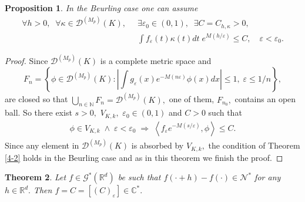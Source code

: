 \documentclass[sn-mathphys,Numbered]{sn-jnl}%
\theoremstyle{thmstyleone}%
\newtheorem{theorem}{Theorem}%
\newtheorem{proposition}[theorem]{Proposition}%
\theoremstyle{thmstyletwo}%
\newtheorem{remark}{Remark}%
\theoremstyle{thmstylethree}%
\begin{document}


\begin{proposition}\label{p6}
In the Beurling case one can assume 
\begin{align*}
\forall h>0,\;\;\forall \kappa\in\mathcal{D}^{(M_p)}(K),\;\;&\exists \varepsilon_0\in (0,1),\;\;\exists C=C_{h,\kappa}>0,\\
&\int f_\varepsilon(t)\kappa(t)dt\;e^{M(h/\varepsilon)}\leq C,\quad \varepsilon<\varepsilon_0.
\end{align*}
\end{proposition}

\begin{proof}
Since $\mathcal{D}^{(M_p)}(K)$ is a complete metric space and 
\begin{equation*}
F_n=\left\{\phi\in \mathcal{D}^{(M_p)}(K): \left|\int g_\varepsilon (x)e^{-M(n\varepsilon)}\phi(x)dx\right|\leq 1, \; \varepsilon\leq 1/n \right\},
\end{equation*}
are closed so that $\bigcup_{n\in\mathbb{N}}F_n=\mathcal{D}^{(M_p)}(K),$ one of them, $F_{n_0},$ contains an open ball. So there exist $s>0,$ $V_{K,k},$ $\varepsilon_0\in (0,1)$ and $C>0$ such that
\begin{align*}
\phi\in V_{K,k}\;\wedge\;\varepsilon<\varepsilon_0\;\Rightarrow\;\left\langle f_\varepsilon e^{-M(s/\varepsilon)},\phi\right\rangle\leq C.
\end{align*}
Since any element in $\mathcal D^{(M_p)}(K)$ is absorbed by $V_{K,k},$ the condition of Theorem \ref{4-2} holds in the Beurling case and as in this theorem we finish the proof.
\end{proof}





\begin{theorem}
Let $f\in \mathcal{G}^{*}(\mathbb{R}^d)$ be such that $f(\cdot+h)-f(\cdot)\in\mathcal N^{*}$  for any $h\in \mathbb{R}^d.$ Then $f=C=[(C)_\varepsilon]\in \mathbb{C}^{*}.$
\end{theorem}
\end{document}
